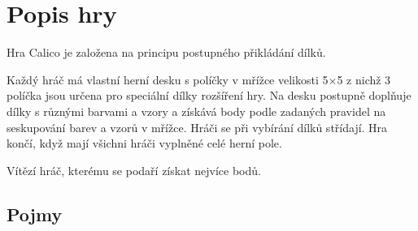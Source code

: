 
\chapter{Popis hry}

Hra Calico je založena na principu postupného přikládání dílků. 

Každý hráč má vlastní herní desku s políčky v mřížce velikosti 5$\times$5 z nichž 3 políčka jsou určena pro speciální dílky rozšíření hry. Na desku postupně doplňuje dílky s různými barvami a vzory a získává body podle zadaných pravidel na seskupování barev a vzorů v mřížce. Hráči se při vybírání dílků střídají. Hra končí, když mají všichni hráči vyplněné celé herní pole.

Vítězí hráč, kterému se podaří získat nejvíce bodů.

\section{Pojmy}


